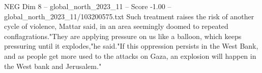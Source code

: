 \begin{textsample}{NEG Dim 8 – global\_north\_2023\_11 – Score -1.00 – global\_north\_2023\_11/103200575.txt}
Such treatment raises the risk of another cycle of violence, Mattar said, in an area seemingly doomed to repeated conflagrations."They are applying pressure on us like a balloon, which keeps pressuring until it explodes,"he said."If this oppression persists in the West Bank, and as people get more used to the attacks on Gaza, an explosion will happen in the West bank and Jerusalem."

\end{textsample}
